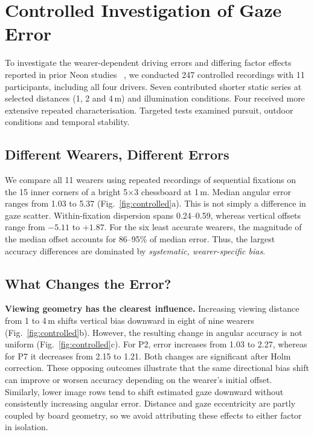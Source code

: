 \section{Controlled Investigation of Gaze Error}
\label{sec:controlled}


To investigate the wearer-dependent driving errors and differing
factor effects reported in prior Neon studies
~\cite{baumann2026neonAccuracy,alecka2026neon,salari2026pupilSize},
we conducted 247 controlled recordings with 11 participants,
including all four drivers.
Seven contributed shorter static series at selected distances
(1, 2 and 4\,m) and illumination conditions. Four received
more extensive repeated characterisation.
Targeted tests examined pursuit, outdoor conditions and temporal
stability.

\subsection{Different Wearers, Different Errors}

We compare all 11 wearers using repeated recordings of
sequential fixations on the 15 inner corners of a bright
5$\times$3 chessboard at 1\,m. Median angular error ranges
from 1.03\dg{} to 5.37\dg{} (Fig.~\ref{fig:controlled}a).
This is not simply a difference in gaze scatter. Within-fixation
dispersion spans 0.24--0.59\dg{}, whereas vertical offsets range
from $-5.11$\dg{} to $+1.87$\dg{}. For the six least accurate
wearers, the magnitude of the median offset accounts for
86--95\% of median error. Thus, the largest accuracy differences
are dominated by \emph{systematic, wearer-specific bias}.

\subsection{What Changes the Error?}

\textbf{Viewing geometry has the clearest influence.}
Increasing viewing distance from 1 to 4\,m shifts vertical
bias downward in eight of nine wearers
(Fig.~\ref{fig:controlled}b). However, the resulting change
in angular accuracy is not uniform (Fig.~\ref{fig:controlled}c).
For P2, error increases from 1.03\dg{} to 2.27\dg{}, whereas
for P7 it decreases from 2.15\dg{} to 1.21\dg{}.
Both changes are significant after Holm correction.
These opposing outcomes illustrate that the same directional
bias shift can improve or worsen accuracy depending on the
wearer's initial offset. Similarly, lower image rows tend to
shift estimated gaze downward without consistently increasing
angular error. Distance and gaze eccentricity are partly
coupled by board geometry, so we avoid attributing these
effects to either factor in isolation.


